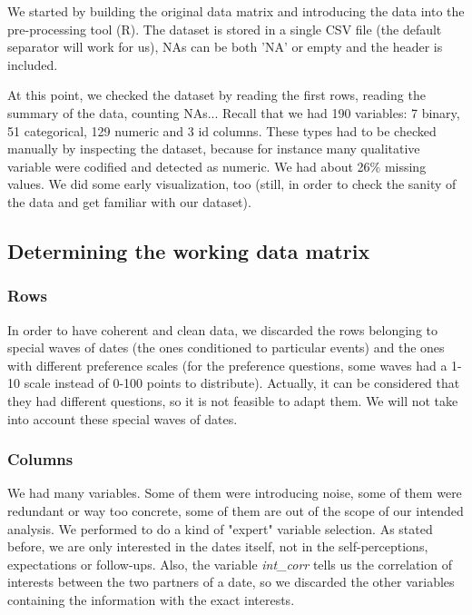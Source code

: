 We started by building the original data matrix and introducing the data into the pre-processing tool (R). The dataset is stored in a single CSV file (the default separator will work for us), NAs can be both 'NA' or empty and the header is included.

At this point, we checked the dataset by reading the first rows, reading the summary of the data, counting NAs... Recall that we had 190 variables: 7 binary, 51 categorical, 129 numeric and 3 id columns. These types had to be checked manually by inspecting the dataset, because for instance many qualitative variable were codified and detected as numeric. We had about 26\% missing values. We did some early visualization, too (still, in order to check the sanity of the data and get familiar with our dataset).


\subsection{Determining the working data matrix}

\subsubsection{Rows}

In order to have coherent and clean data, we discarded the rows belonging to special waves of dates (the ones conditioned to particular events) and the ones with different preference scales (for the preference questions, some waves had a 1-10 scale instead of 0-100 points to distribute). Actually, it can be considered that they had different questions, so it is not feasible to adapt them. We will not take into account these special waves of dates.

\subsubsection{Columns}

We had many variables. Some of them were introducing noise, some of them were redundant or way too concrete, some of them are out of the scope of our intended analysis. We performed to do a kind of "expert" variable selection. As stated before, we are only interested in the dates itself, not in the self-perceptions, expectations or follow-ups. Also, the variable \textit{int\_corr} tells us the correlation of interests between the two partners of a date, so we discarded the other variables containing the information with the exact interests.

